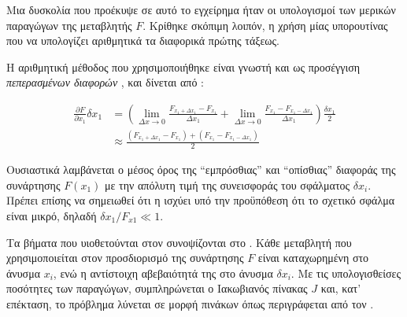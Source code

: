 Μια δυσκολία που προέκυψε σε αυτό το εγχείρημα ήταν οι υπολογισμοί των μερικών παραγώγων της μεταβλητής $F$. Κρίθηκε σκόπιμη λοιπόν, η χρήση μίας υπορουτίνας που να υπολογίζει αριθμητικά τα διαφορικά πρώτης τάξεως.

Η αριθμητική μέθοδος που χρησιμοποιήθηκε είναι γνωστή και ως προσέγγιση \textit{πεπερασμένων διαφορών} \cite{1995_Wilmott_BOOK}, και δίνεται από \cite{2021_Moffat_BOOK}: 

\begin{equation}\label{eq:autorss}
\begin{split}
\frac{\partial F}{\partial x_1} \delta x_1 &= \left(\lim_{\Delta x \to 0} \frac{F_{x_1 + \Delta x_1} - F_{x_1}}{\Delta x_1} + \lim_{\Delta x \to 0} \frac{F_{x_1} - F_{x_1 - \Delta x_1}}{\Delta x_1} \right) \frac{\delta x_1}{2}\\
&\approx \frac{\left(F_{x_1 + \Delta x_1} - F_{x_1} \right) + \left(F_{x_1} - F_{x_1 - \Delta x_1} \right)}{2}
\end{split}
\end{equation}

\noindent Ουσιαστικά λαμβάνεται ο μέσος όρος της \enquote{εμπρόσθιας} και \enquote{οπίσθιας} διαφοράς της συνάρτησης $F(x_1)$ με την απόλυτη τιμή της συνεισφοράς του σφάλματος $\delta x_i$. Πρέπει επίσης να σημειωθεί ότι η  ισχύει υπό την προϋπόθεση ότι το σχετικό σφάλμα είναι μικρό, δηλαδή ${\delta x_1 / F_{x1} \ll 1}$.

Τα βήματα που υιοθετούνται στον  συνοψίζονται στο . Κάθε μεταβλητή που χρησιμοποιείται στον προσδιορισμό της συνάρτησης $F$ είναι καταχωρημένη στο άνυσμα $x_i$, ενώ η αντίστοιχη αβεβαιότητά της στο άνυσμα $\delta x_i$. Με τις υπολογισθείσες ποσότητες των παραγώγων, συμπληρώνεται ο Ιακωβιανός πίνακας $J$ και, κατ' επέκταση, το πρόβλημα λύνεται σε μορφή πινάκων όπως περιγράφεται από τον \citeauthor{1998_Arras_TECH_REPORT} \cite{1998_Arras_TECH_REPORT}.

